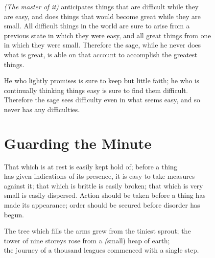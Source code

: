     \textit{(The master of it)} anticipates things that are difficult while they\\
    are easy, and does things that would become great while they are\\
    small. All difficult things in the world are sure to arise from a\\
    previous state in which they were easy, and all great things from one\\
    in which they were small. Therefore the sage, while he never does\\
    what is great, is able on that account to accomplish the greatest\\
    things.\vspace{\baselineskip}
    
    He who lightly promises is sure to keep but little faith; he who is\\
    continually thinking things easy is sure to find them difficult.\\
    Therefore the sage sees difficulty even in what seems easy, and so\\
    never has any difficulties.\vspace{\baselineskip}
\section*{Guarding the Minute}
    That which is at rest is easily kept hold of; before a thing\\
    has given indications of its presence, it is easy to take measures\\
    against it; that which is brittle is easily broken; that which is very\\
    small is easily dispersed. Action should be taken before a thing has\\
    made its appearance; order should be secured before disorder has\\
    begun.\vspace{\baselineskip}
    
    The tree which fills the arms grew from the tiniest sprout; the\\
    tower of nine storeys rose from a \textit(small) heap of earth;\\
    the journey of a thousand leagues commenced with a single step.\vspace{\baselineskip}
    
